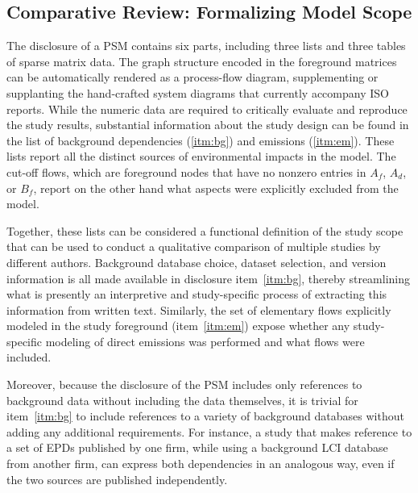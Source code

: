 

\subsection{Comparative Review: Formalizing Model Scope}

The disclosure of a PSM contains six parts, including three lists and three tables of sparse matrix data.  The graph structure encoded in the foreground matrices can be automatically rendered as a process-flow diagram, supplementing or supplanting the hand-crafted system diagrams that currently accompany ISO reports. While the numeric data are required to critically evaluate and reproduce the study results, substantial information about the study design can be found in the list of background dependencies (\ref{itm:bg}) and emissions (\ref{itm:em}).  These lists report all the distinct sources of environmental impacts in the model.  The cut-off flows, which are foreground nodes that have no nonzero entries in $A_f$, $A_d$, or $B_f$, report on the other hand what aspects were explicitly excluded from the model.

Together, these lists can be considered a functional definition of the study scope that can be used to conduct a qualitative comparison of multiple studies by different authors.  Background database choice, dataset selection, and version information is all made available in disclosure item~\ref{itm:bg}, thereby streamlining what is presently an interpretive and study-specific process of extracting this information from written text.  Similarly, the set of elementary flows explicitly modeled in the study foreground (item~\ref{itm:em}) expose whether any study-specific modeling of direct emissions was performed and what flows were included.

Moreover, because the disclosure of the PSM includes only references to background data without including the data themselves, it is trivial for item~\ref{itm:bg} to include references to a variety of background databases without adding any additional requirements.  For instance, a study that makes reference to a set of EPDs published by one firm, while using a background LCI database from another firm, can express both dependencies in an analogous way, even if the two sources are published independently.  


